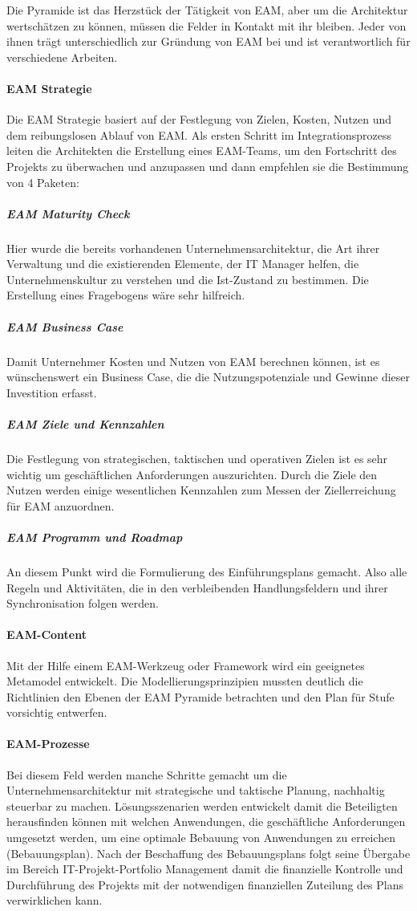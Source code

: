 \documentclass[
	doc,
	a4paper,
	helv
	]{apa6}
\begin{document}
Die Pyramide ist das Herzstück der Tätigkeit von EAM, aber um die Architektur wertschätzen zu können, müssen die Felder in Kontakt mit ihr bleiben. Jeder von ihnen trägt unterschiedlich zur Gründung von EAM bei und ist verantwortlich für verschiedene Arbeiten.


\paragraph{EAM Strategie}
Die EAM Strategie basiert auf der Festlegung von Zielen, Kosten, Nutzen und dem reibungslosen Ablauf von EAM. Als ersten Schritt im Integrationsprozess leiten die Architekten die Erstellung eines EAM-Teams, um den Fortschritt des Projekts zu überwachen und anzupassen und dann empfehlen sie die Bestimmung von 4 Paketen:

\subparagraph{EAM Maturity Check}
Hier wurde die bereits vorhandenen Unternehmensarchitektur, die Art ihrer Verwaltung und die existierenden Elemente, der IT Manager helfen, die Unternehmenskultur zu verstehen und die Ist-Zustand zu bestimmen. Die Erstellung eines Fragebogens wäre sehr hilfreich.

\subparagraph{EAM Business Case}
Damit Unternehmer Kosten und Nutzen von EAM berechnen können, ist es wünschenswert ein Business Case, die die Nutzungspotenziale und Gewinne dieser Investition erfasst.

\subparagraph{EAM Ziele und Kennzahlen}
Die Festlegung von strategischen, taktischen und operativen Zielen ist es sehr wichtig um geschäftlichen Anforderungen auszurichten. Durch die Ziele den Nutzen werden einige wesentlichen Kennzahlen zum Messen der Ziellerreichung für EAM anzuordnen.

\subparagraph{EAM Programm und Roadmap}
An diesem Punkt wird die Formulierung des Einführungsplans gemacht. Also alle Regeln und Aktivitäten, die in den verbleibenden Handlungsfeldern und ihrer Synchronisation folgen werden.

\paragraph{EAM-Content}
Mit der Hilfe einem EAM-Werkzeug oder Framework wird ein geeignetes Metamodel entwickelt. Die Modellierungsprinzipien mussten deutlich die Richtlinien den Ebenen der EAM Pyramide betrachten und den Plan für Stufe vorsichtig entwerfen.

\paragraph{EAM-Prozesse}
Bei diesem Feld werden manche Schritte gemacht um die Unternehmensarchitektur mit strategische und taktische Planung, nachhaltig steuerbar zu machen. Lösungsszenarien werden entwickelt damit die Beteiligten herausfinden können mit welchen Anwendungen, die geschäftliche Anforderungen umgesetzt werden, um eine optimale Bebauung von Anwendungen zu erreichen (Bebauungsplan).  Nach der Beschaffung des Bebauungsplans folgt seine Übergabe im Bereich IT-Projekt-Portfolio Management damit die finanzielle Kontrolle und Durchführung des Projekts mit der notwendigen finanziellen Zuteilung des Plans verwirklichen kann.
\end{document}
